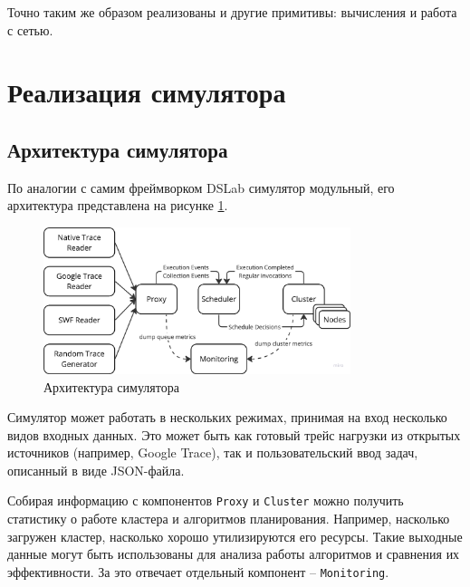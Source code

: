 Точно таким же образом реализованы и другие примитивы: вычисления и  работа с сетью. 


\section{Реализация симулятора}


\subsection{Архитектура симулятора}

По аналогии с самим фреймворком DSLab симулятор модульный, его архитектура представлена на рисунке \ref{fig:arch}.

\begin{figure}[h!]
    \centering 
    \includegraphics[width=0.8\textwidth]{images/simulator_arc}
    \caption{Архитектура симулятора}
    \label{fig:arch}
\end{figure}

Симулятор может работать в нескольких режимах, принимая на вход несколько видов входных данных. Это может быть как готовый трейс нагрузки из открытых источников (например, Google Trace), так и пользовательский ввод задач, описанный в виде JSON-файла.

Собирая информацию с компонентов \texttt{Proxy} и \texttt{Cluster} можно получить статистику о работе кластера и алгоритмов планирования. Например, насколько загружен кластер, насколько хорошо утилизируются его ресурсы. Такие выходные данные могут быть использованы для анализа работы алгоритмов и сравнения их эффективности. За это отвечает отдельный компонент -- \texttt{Monitoring}.


